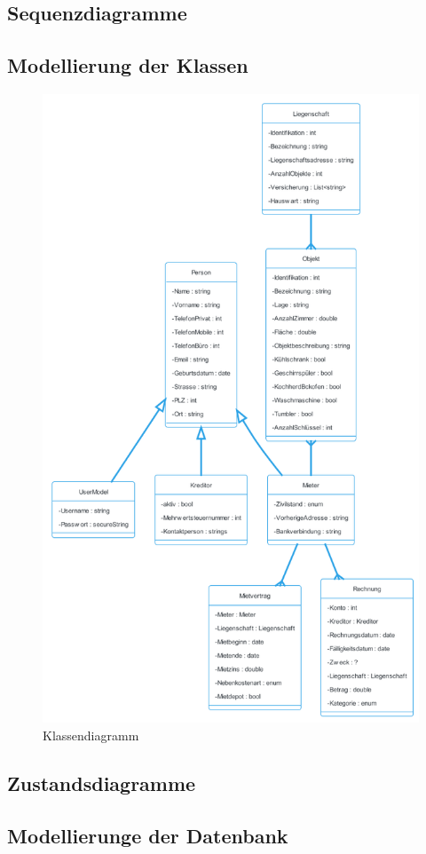 \subsection{Sequenzdiagramme}
\subsection{Modellierung der Klassen}
\begin{figure}[H]
  \begin{center}
    \includegraphics[width=0.75\linewidth]{content/diagrams/out/classdiagramm/ImmoGlobal.png}
    \caption{Klassendiagramm}
  \end{center}
\end{figure}

\subsection{Zustandsdiagramme}
\subsection{Modellierunge der Datenbank}
